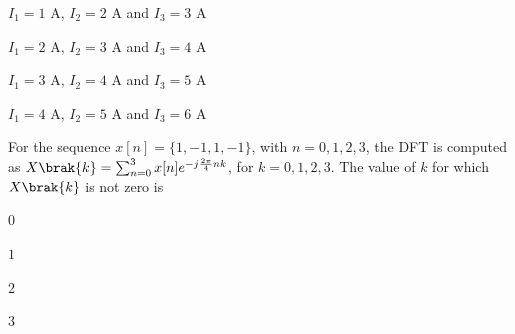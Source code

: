     \hfill{}
    \begin{enumerate}
        \begin{multicols}{2}
            \item $I_{1}=1$ A, $I_{2}=2$ A and $I_{3}=3$ A
            \item $I_{1}=2$ A, $I_{2}=3$ A and $I_{3}=4$ A
            \item $I_{1}=3$ A, $I_{2}=4$ A and $I_{3}=5$ A
            \item $I_{1}=4$ A, $I_{2}=5$ A and $I_{3}=6$ A
        \end{multicols}
    \end{enumerate}
    \item For the sequence $x[n] = \{1, -1, 1, -1\}$, with $n = 0,1,2,3$, the DFT is computed as $X\brak{k} = \sum_{n=0}^{3} x[n]e^{-j\frac{2\pi}{4}nk}$, for $k = 0,1,2,3$. The value of $k$ for which $X\brak{k}$ is not zero is
    \hfill{}
    \begin{enumerate}
        \begin{multicols}{4}
            \item $0$
            \item $1$
            \item $2$
            \item $3$
        \end{multicols}
    \end{enumerate}
    
